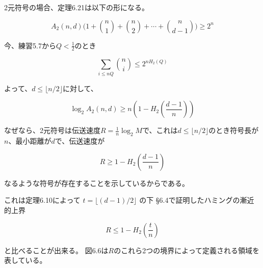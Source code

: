 \documentclass[12pt,a4paper]{article}
\begin{document}
        2元符号の場合、定理6.21は以下の形になる。

        \[ A_2(n, d) \big( 1 + \binom n1 + \binom n2 + \cdots + \binom{n}{d - 1} \big) \geq 2^n \]

        \noindent 今、練習5.7から$Q < \frac 12$のとき

        \[ \underset{i \leq nQ}{\sum} \binom ni \leq 2^{nH_2 (Q)} \]

        \noindent よって、$d \leq \lfloor n / 2 \rfloor$に対して、

        \[ \log_2 A_2(n, d) \geq n(1 - H_2 (\frac{d - 1}{n})) \]

        \noindent なぜなら、2元符号は伝送速度$R = \frac 1n \log_2 M$で、これは$d \leq \lfloor n / 2 \rfloor$のとき符号長が$n$、最小距離が$d$で、伝送速度が

        \[ R \geq 1 - H_2 ( \frac{d - 1}{n}) \]

        \noindent なるような符号が存在することを示しているからである。

        これは定理6.10によって $t = \lfloor (d - 1) / 2 \rfloor$ の下 \S 6.4で証明したハミングの漸近的上界

        \[ R \leq 1 - H_2 (\frac tn ) \]

        \noindent と比べることが出来る。
        \noindent 図6.6は$R$のこれら2つの境界によって定義される領域を表している。
\end{document}
